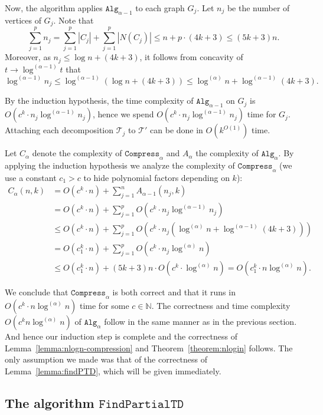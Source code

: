 \documentclass[a4paper,11pt]{article}
\theoremstyle{definition}
\theoremstyle{remark}
\newcommand{\depth}{\alpha}
\newcommand{\findPTD}{\mathtt{FindPartialTD}}
\newcommand{\compress}[1]{\mathtt{Compress}_{#1}}
\newcommand{\alg}[1]{\mathtt{Alg}_{#1}}
\newcommand{\td}{\mathcal{T}} \newcommand{\tw}{\mathrm{tw}} \newcommand{\w}{\mathrm{w}}
\begin{document}
Now, the algorithm applies $\alg{\depth-1}$ to each graph $G_j$.  Let
$n_j$ be the number of vertices of $G_j$.  Note that
\[
\sum_{j=1}^p n_j= \sum_{j=1}^p |C_j|+\sum_{j=1}^p |N(C_j)|\leq n+p\cdot
(4k+3)\leq (5k+3)n.
\]
Moreover, as $n_j\leq \log n + (4k+3)$, it follows from concavity of $t
\to \log^{(\depth-1)} t$ that
\[
\log^{(\depth-1)} n_j \leq \log^{(\depth-1)}(\log n + (4k+3)) \leq
\log^{(\depth)} n + \log^{(\depth-1)} (4k+3).
\]

By the induction hypothesis, the time complexity of $\alg{\depth-1}$
on $G_j$ is $O(c^k \cdot n_j \log^{(\depth-1)} n_j)$, hence we spend
$O(c^k \cdot n_j \log^{(\depth-1)}n_j)$ time for $G_j$.  Attaching
each decomposition $\td_j$ to $\td'$ can be done in $O(k^{O(1)})$
time.

Let $C_\depth$ denote the complexity of $\compress{\depth}$ and
$A_\depth$ the complexity of $\alg{\depth}$.  By applying the
induction hypothesis we analyze the complexity of $\compress{\depth}$
(we use a constant $c_1>c$ to hide polynomial factors depending on
$k$):
\begin{align*}
  C_\depth(n,k) &= O(c^k\cdot n) + \sum\limits_{j=1}^{n}A_{\depth-1}(n_j,k)\\
  &= O(c^k\cdot n) + \sum\limits_{j=1}^{p}O(c^k\cdot n_j \log^{(\depth-1)}n_j)\\
  &\leq O(c^k\cdot n) + \sum\limits_{j=1}^{p}O(c^k\cdot n_j (\log^{(\depth)}n + \log^{(\depth-1)} (4k+3)))\\
  &= O(c_1^k\cdot n) + \sum\limits_{j=1}^{p}O(c^k\cdot n_j\log^{(\depth)}n )\\
  &\leq O(c_1^k\cdot n) + (5k+3)n \cdot O(c^k\cdot \log^{(\depth)}n) =
  O(c_1^k\cdot n\log^{(\depth)}n).
\end{align*}

We conclude that $\compress{\depth}$ is both correct and that it runs
in $O(c^k\cdot n\log^{(\depth)}n)$ time for some $c\in \mathbb{N}$.
The correctness and time complexity $O(c^kn\log^{(\depth)}n)$ of
$\alg{\depth}$ follow in the same manner as in the previous section.
And hence our induction step is complete and the correctness of
Lemma~\ref{lemma:nlogn-compression} and Theorem~\ref{theorem:nlogin}
follows.  The only assumption we made was that of the correctness of
Lemma~\ref{lemma:findPTD}, which will be given immediately.


\subsection{The algorithm $\findPTD$}
\end{document}
